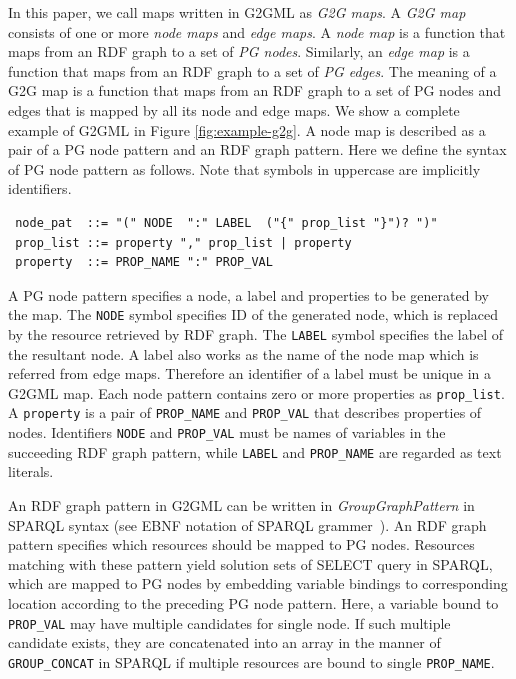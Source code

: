 \documentclass[runningheads]{llncs}
\begin{document}
\par
In this paper, we call maps written in G2GML as \textit{G2G maps}.
A \textit{G2G map} consists of one or more \textit{node maps} and \textit{edge maps}.
A \textit{node map} is a function that maps from an RDF graph to a set of \textit{PG nodes}. 
Similarly, an \textit{edge map} is a function that maps from an RDF graph to a set of \textit{PG edges}.
The meaning of a G2G map is a function that maps from an RDF graph to a set of PG nodes and edges that is mapped by  all its node and edge maps. We show a complete example of G2GML in Figure \ref{fig:example-g2g}.
A node map is described as a pair of a PG node pattern  and an RDF graph pattern. Here we define the syntax of PG node pattern as follows. Note that symbols in uppercase are implicitly identifiers.
\begin{defi}
\leavevmode
\begin{verbatim}
 node_pat  ::= "(" NODE  ":" LABEL  ("{" prop_list "}")? ")"
 prop_list ::= property "," prop_list | property
 property  ::= PROP_NAME ":" PROP_VAL
\end{verbatim}
\end{defi}

A PG node pattern specifies a node, a label and properties to be generated by the map. The \texttt{NODE} symbol specifies ID of the generated node, which is replaced by the resource retrieved by RDF graph. The \texttt{LABEL} symbol specifies the label of the resultant node. A label also works as the name of the node map which is referred from edge maps.
Therefore an identifier of a label must be unique in a  G2GML map.
Each node pattern contains zero or more properties as \texttt{prop\_list}.
A \texttt{property} is a pair of \texttt{PROP\_NAME} and \texttt{PROP\_VAL} that describes properties of nodes.
Identifiers \texttt{NODE} and \texttt{PROP\_VAL} must be names of variables in the succeeding RDF graph pattern, while \texttt{LABEL} and \texttt{PROP\_NAME} are regarded as text literals.

An RDF graph pattern in G2GML can be written in \textit{GroupGraphPattern} in SPARQL syntax (see EBNF notation of SPARQL grammer~\cite{sparql}).
An RDF graph pattern specifies which resources should be mapped to PG nodes. Resources matching with these pattern yield solution sets of SELECT query in SPARQL, which 
 are mapped to PG nodes by embedding variable bindings to corresponding location according to the preceding PG node pattern.
Here, a variable bound to \texttt{PROP\_VAL} may have multiple candidates for single node. If such multiple candidate exists, they are concatenated into an array in the manner of \texttt{GROUP\_CONCAT} in SPARQL if multiple resources are bound to single \texttt{PROP\_NAME}.
\end{document}
